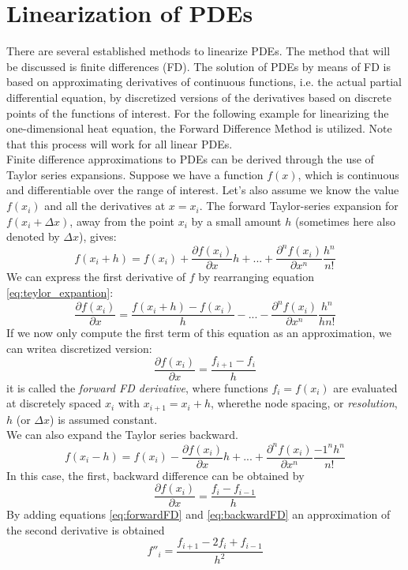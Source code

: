 \section{Linearization of PDEs}
There are several established methods to linearize PDEs. The method that will be discussed is finite differences (FD). The solution of PDEs by means of FD is based on approximating derivatives of continuous functions, i.e. the actual partial differential equation, by discretized versions of the derivatives based on discrete points of the functions of interest. For the following example for linearizing the one-dimensional heat equation,  the Forward Difference Method is utilized. Note that this process will work for all linear PDEs. \\
Finite difference approximations to PDEs can be derived through the use of Taylor series expansions.  Suppose we have a function $f(x)$,  which is continuous and differentiable over the range of interest. Let’s also assume we know the value $f(x_i)$ and all the derivatives at $x=x_i$. The forward Taylor-series expansion for $f(x_{i}+ \Delta x)$, away from the point $x_i$ by a small amount $h$ (sometimes here also denoted by $\Delta x$), gives:
\begin{equation}
\label{eq:teylor_expantion}
f(x_i+h)=f(x_i)+\frac{\partial f(x_i)}{\partial x} h + ... + \frac{\partial^n f(x_i)}{\partial x^n} \frac{h^n}{n!}
\end{equation}
We can express the first derivative of $f$ by rearranging equation \ref{eq:teylor_expantion}:
\begin{equation}
\frac{\partial f(x_i)}{\partial x}=\frac{f(x_i+h)-f(x_i)}{h} -... - \frac{\partial^n f(x_i)}{\partial x^n} \frac{h^n}{hn!}
\end{equation}
If we now only compute the first term of this equation as an approximation, we can writea discretized version:
\begin{equation}
\label{eq:forwardFD}
\frac{\partial f(x_i)}{\partial x}=\frac{f_{i+1}-f_i}{h}
\end{equation}
it is called the \textit{forward FD derivative}, where functions $f_i=f(x_i)$ are evaluated at discretely spaced $x_i$ with $x_{i+1}=x_i+h$, wherethe node spacing, or \textit{resolution}, $h$ (or $\Delta x$) is assumed constant.
\\

We can also expand the Taylor series backward.
\begin{equation}
f(x_i-h)=f(x_i)-\frac{\partial f(x_i)}{\partial x} h + ... + \frac{\partial^n f(x_i)}{\partial x^n} \frac{-1^n h^n}{n!}
\end{equation}
In this case, the first, backward difference can be obtained by
\begin{equation}
\label{eq:backwardFD}
\frac{\partial f(x_i)}{\partial x}=\frac{f_{i}-f_{i-1}}{h}
\end{equation}
By adding equations \ref{eq:forwardFD} and \ref{eq:backwardFD} an approximation of the second derivative is obtained
\begin{equation}
\label{eq:secondDerivative}
f''_i=\frac{f_{i+1}-2f_i+f_{i-1}}{h^2}
\end{equation}
